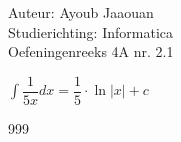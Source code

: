 \documentclass[a4paper]{article}
\begin{document}
\noindent \large Auteur: Ayoub Jaaouan \\
\noindent \large Studierichting: Informatica\\
\noindent \large Oefeningenreeks 4A nr. 2.1\\

\medskip

\normalsize

$\displaystyle\int \dfrac{1}{5x}  dx =   \dfrac{1}{5}\cdot \ln|x| + c$\\


\begin{thebibliography}{999}
\end{thebibliography}
\end{document}
